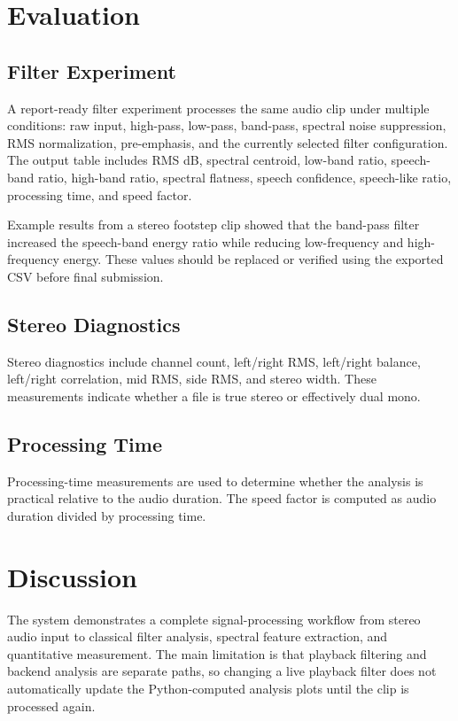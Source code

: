 \documentclass[11pt,a4paper]{article}
\begin{document}
\section{Evaluation}
\subsection{Filter Experiment}
A report-ready filter experiment processes the same audio clip under multiple conditions: raw input, high-pass, low-pass, band-pass, spectral noise suppression, RMS normalization, pre-emphasis, and the currently selected filter configuration. The output table includes RMS dB, spectral centroid, low-band ratio, speech-band ratio, high-band ratio, spectral flatness, speech confidence, speech-like ratio, processing time, and speed factor.

Example results from a stereo footstep clip showed that the band-pass filter increased the speech-band energy ratio while reducing low-frequency and high-frequency energy. These values should be replaced or verified using the exported CSV before final submission.

\subsection{Stereo Diagnostics}
Stereo diagnostics include channel count, left/right RMS, left/right balance, left/right correlation, mid RMS, side RMS, and stereo width. These measurements indicate whether a file is true stereo or effectively dual mono.

\subsection{Processing Time}
Processing-time measurements are used to determine whether the analysis is practical relative to the audio duration. The speed factor is computed as audio duration divided by processing time.

\section{Discussion}
The system demonstrates a complete signal-processing workflow from stereo audio input to classical filter analysis, spectral feature extraction, and quantitative measurement. The main limitation is that playback filtering and backend analysis are separate paths, so changing a live playback filter does not automatically update the Python-computed analysis plots until the clip is processed again.
\end{document}
